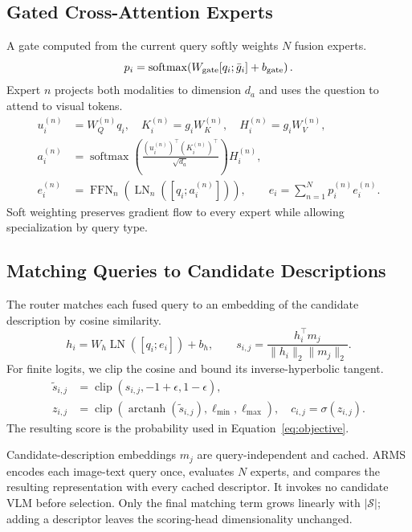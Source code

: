 \documentclass[letterpaper]{article}
\begin{document}
\subsection{Gated Cross-Attention Experts}

A gate computed from the current query softly weights $N$ fusion experts.
\begin{equation}
p_i=\operatorname{softmax}\!\left(W_{\rm gate}[q_i;\bar g_i]+b_{\rm gate}\right).
\label{eq:gate}
\end{equation}
Expert $n$ projects both modalities to dimension $d_a$ and uses the question
to attend to visual tokens.
\begin{align}
u_i^{(n)}&=W_Q^{(n)}q_i, \quad K_i^{(n)}=g_iW_K^{(n)},
\quad H_i^{(n)}=g_iW_V^{(n)},\nonumber\\
a_i^{(n)}&=\operatorname{softmax}\!\left(
\frac{(u_i^{(n)})^\top(K_i^{(n)})^\top}{\sqrt{d_a}}\right)H_i^{(n)},\nonumber\\
e_i^{(n)}&=\operatorname{FFN}_n\!\left(\operatorname{LN}_n
([q_i;a_i^{(n)}])\right),\qquad
e_i=\sum_{n=1}^{N}p_i^{(n)}e_i^{(n)}.
\label{eq:experts}
\end{align}
Soft weighting preserves gradient flow to every expert while allowing
specialization by query type.

\subsection{Matching Queries to Candidate Descriptions}

The router matches each fused query to an embedding of the candidate description
by cosine similarity.
\small
\begin{equation}
h_i=W_h\operatorname{LN}([q_i;e_i])+b_h,\qquad
s_{i,j}=\frac{h_i^\top m_j}{\lVert h_i\rVert_2\lVert m_j\rVert_2}.
\end{equation}
\normalsize
For finite logits, we clip the cosine and bound its inverse-hyperbolic tangent.
\small
\begin{align}
\tilde s_{i,j}&=\operatorname{clip}(s_{i,j},-1+\epsilon,1-\epsilon),\nonumber\\
z_{i,j}&=\operatorname{clip}(\operatorname{arctanh}(\tilde s_{i,j}),
\ell_{\min},\ell_{\max}),\quad c_{i,j}=\sigma(z_{i,j}).
\label{eq:score}
\end{align}
\normalsize
The resulting score is the probability used in
Equation~\ref{eq:objective}.

Candidate-description embeddings $m_j$ are query-independent and cached. ARMS
encodes each image-text query once, evaluates $N$ experts, and compares the
resulting representation with every cached descriptor. It invokes no candidate
VLM before selection. Only the final matching term grows linearly with
$|\mathcal{S}|$; adding a descriptor leaves the scoring-head dimensionality
unchanged.
\end{document}

